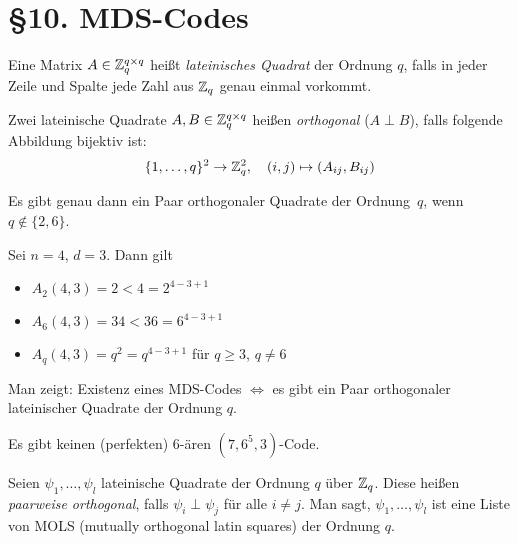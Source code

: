 \documentclass{cheat-sheet}
\begin{document}
\section{§10. MDS-Codes}


\begin{defn}
  Eine Matrix $A \in \mathbb{Z}_q^{q \times q}$ heißt \emph{lateinisches Quadrat} der Ordnung $q$, falls in jeder Zeile und Spalte jede Zahl aus $\mathbb{Z}_q$ genau einmal vorkommt.
\end{defn}

\begin{defn}
  Zwei lateinische Quadrate $A, B \in \mathbb{Z}_q^{q \times q}$ heißen \emph{orthogonal} ($A \perp B$), falls folgende Abbildung bijektiv ist:
  \[
    \{ 1, \ldots, q \}^2 \to \mathbb{Z}_q^2, \quad
    (i, j) \mapsto (A_{ij}, B_{ij})
  \]
\end{defn}

\begin{satz}
  Es gibt genau dann ein Paar orthogonaler Quadrate der Ordnung~$q$, wenn $q \not\in \{ 2, 6 \}$.
\end{satz}

\begin{satz}
  Sei $n=4$, $d=3$.
  Dann gilt
  \begin{itemize}
    \item $A_2(4, 3) = 2 < 4 = 2^{4-3+1}$
    \item $A_6(4,3) = 34 < 36 = 6^{4-3+1}$
    \item $A_q(4,3) = q^2 = q^{4-3+1}$ für $q \geq 3$, $q \neq 6$
  \end{itemize}
\end{satz}

\begin{beweisidee}
  Man zeigt: Existenz eines MDS-Codes $\iff$ es gibt ein Paar orthogonaler lateinischer Quadrate der Ordnung $q$.
\end{beweisidee}

\begin{satz}
  Es gibt keinen (perfekten) $6$-ären $(7, 6^5, 3)$-Code.
\end{satz}

\begin{defn}
  Seien $\psi_1, \ldots, \psi_l$ lateinische Quadrate der Ordnung $q$ über $\mathbb{Z}_q$.
  Diese heißen \emph{paarweise orthogonal}, falls $\psi_i \perp \psi_j$ für alle $i \neq j$.
  Man sagt, $\psi_1, \ldots, \psi_l$ ist eine Liste von MOLS (mutually orthogonal latin squares) der Ordnung $q$.
\end{defn}
\end{document}
